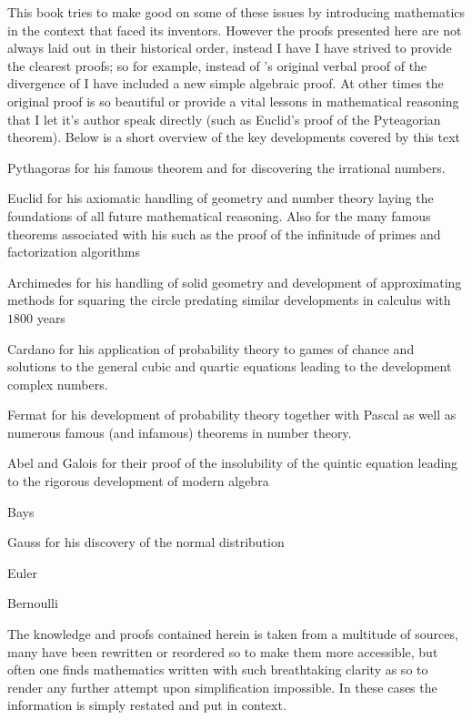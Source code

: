 This book tries to make good on some of these issues by introducing mathematics in the context that faced its inventors. However the proofs presented here are not always laid out in their historical order, instead I have I have strived to provide the clearest proofs; so for example, instead of 's original verbal proof of the divergence of  I have included a new simple algebraic proof. At other times the original proof is so beautiful or provide a vital lessons in mathematical reasoning that I let it's author speak directly (such as Euclid's proof of the Pyteagorian theorem). Below is a short overview of the key developments covered by this text
\begin{description}
    \item Pythagoras for his famous theorem and for discovering the irrational numbers.
    \item Euclid for his axiomatic handling of geometry and number theory laying the foundations of all future mathematical reasoning. Also for the many famous theorems associated with his such as the proof of the infinitude of primes and factorization algorithms
    \item Archimedes for his handling of solid geometry and development of approximating methods for squaring the circle predating similar developments in calculus with $1800$ years
    \item Cardano for his application of probability theory to games of chance and solutions to the general cubic and quartic equations leading to the development complex numbers.
  \item Fermat for his development of probability theory together with Pascal as well as numerous famous (and infamous) theorems in number theory.
    \item Abel and Galois for their proof of the insolubility of the quintic equation leading to the rigorous development of modern algebra
    \item Bays
    \item Gauss for his discovery of the normal distribution
    \item Euler
    \item Bernoulli
\end{description}

The knowledge and proofs contained herein is taken from a multitude of sources, many have been rewritten or reordered so to make them more accessible, but often one finds mathematics written with such breathtaking clarity as so to render any further attempt upon simplification impossible. In these cases the information is simply restated and put in context.

